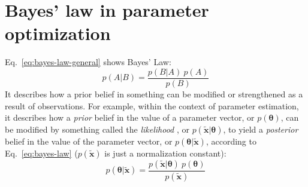 \section{Bayes' law in parameter optimization}


Eq.~\ref{eq:bayes-law-general} shows Bayes' Law:
\begin{equation}\label{eq:bayes-law-general}
p(A|B) = \frac{p(B|A)\:p(A)}{p(B)}
\end{equation}
It describes how a prior belief in something can be modified or strengthened as a result of observations. For example, within the context of parameter estimation, it describes how a \textit{prior} belief in the value of a parameter vector, or $p(\boldsymbol\theta)$, can be modified by something called the \textit{likelihood} , or $p(\tilde{\mathbf{x}}|\boldsymbol\theta)$, to yield a \textit{posterior} belief in the value of the parameter vector, or $p(\boldsymbol\theta|\tilde{\mathbf{x}})$,  according to Eq.~\ref{eq:bayes-law} ($p(\tilde{\mathbf{x}})$ is just a normalization constant):
\begin{equation}\label{eq:bayes-law}
p(\boldsymbol\theta|\tilde{\mathbf{x}}) = \frac{p(\tilde{\mathbf{x}}|\boldsymbol\theta)\:p(\boldsymbol\theta)}{p(\tilde{\mathbf{x}})}
\end{equation}

%
%
%
%
%
%




